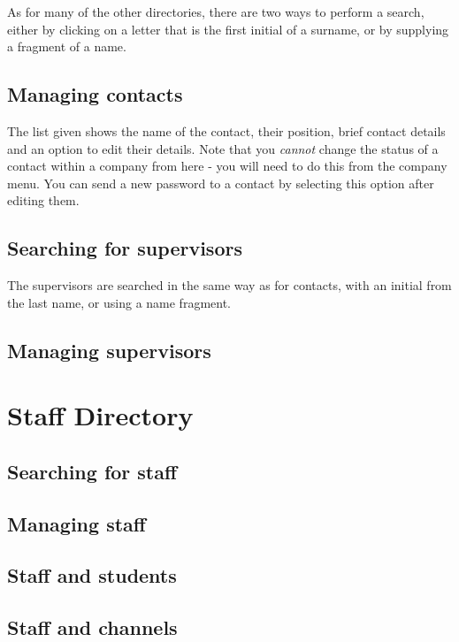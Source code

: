 \documentclass[12 pt]{book}
\begin{document}
As for many of the other directories, there are two ways to perform a search, either by clicking on
a letter that is the first initial of a surname, or by supplying a fragment of a name.

\section{Managing contacts}

The list given shows the name of the contact, their position, brief contact details and an option to
edit their details. Note that you \emph{cannot} change the status of a contact within a company
from here - you will need to do this from the company menu. You can send a new password to a contact
by selecting this option after editing them.

\section{Searching for supervisors}

The supervisors are searched in the same way as for contacts, with an initial from the last name,
or using a name fragment.

\section{Managing supervisors}
%
%
%

\chapter{Staff Directory}

\section{Searching for staff}

\section{Managing staff}

\section{Staff and students}

\section{Staff and channels}
\end{document}
